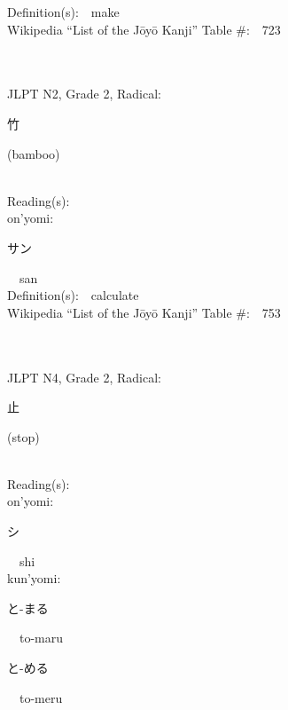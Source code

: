 \begin{multicols}{2}
Definition(s):\ \ make \\
Wikipedia ``List of the J\=oy\=o Kanji'' Table \#:\ \ 723 \\
\ \ \\
{\fontsize{34pt}{40pt}  }\ \ \\  %
{JLPT N2, Grade 2, Radical:\ \ {\begin{CJK}{UTF8}{min} 竹 \end{CJK}} (bamboo) } \\
Reading(s):\ \ \\
{\hspace*{1em}}on'yomi:\ \ \\
{\hspace*{2em}}{\begin{CJK}{UTF8}{min} サン \end{CJK}}\ \ san\ \ \\
Definition(s):\ \ calculate \\
Wikipedia ``List of the J\=oy\=o Kanji'' Table \#:\ \ 753 \\
\ \ \\
{\fontsize{34pt}{40pt}  }\ \ \\  %
{JLPT N4, Grade 2, Radical:\ \ {\begin{CJK}{UTF8}{min} 止 \end{CJK}} (stop) } \\
Reading(s):\ \ \\
{\hspace*{1em}}on'yomi:\ \ \\
{\hspace*{2em}}{\begin{CJK}{UTF8}{min} シ \end{CJK}}\ \ shi\ \ \\
{\hspace*{1em}}kun'yomi:\ \ \\
{\hspace*{2em}}{\begin{CJK}{UTF8}{min} と-まる \end{CJK}}\ \ to-maru\ \ \\
{\hspace*{2em}}{\begin{CJK}{UTF8}{min} と-める \end{CJK}}\ \ to-meru\ \ \\

\end{multicols}
